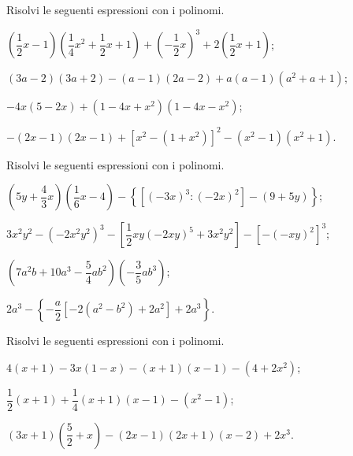 \begin{esercizio}
\label{ese:11.46} %
Risolvi le seguenti espressioni con i polinomi.
 \begin{enumeratea}
 \item $\left(\dfrac{1}{2}x-1\right)\left(\dfrac{1}{4}x^{2}+\dfrac{1}{2}x+1\right)+\left(-{\dfrac{1}{2}}x\right)^{3}+2\left(\dfrac{1}{2}x+1\right)$;
 \item $(3a-2)(3a+2)-(a-1)(2a-2)+a(a-1)\left(a^{2}+a+1\right)$;
 \item $-4x(5-2x)+\left(1-4x+x^{2}\right)\left(1-4x-x^{2}\right)$;
 \item $-(2x-1)(2x-1)+\left[x^{2}-\left(1+x^{2}\right)\right]^{2}-\left(x^{2}-1\right)\left(x^{2}+1\right)$.
 \end{enumeratea}
\end{esercizio}

\begin{esercizio}[\Ast]
\label{ese:11.47}
Risolvi le seguenti espressioni con i polinomi.
 \begin{enumeratea}
 \item $\left(5y+\dfrac{4}{3}x\right)\left(\dfrac{1}{6}x-4\right)-\left\lbrace\left[(-3x)^3:(-2x)^2\right]-(9+5y)\right\rbrace$;
 \item $3x^{2}y^{2}-\left(-2x^{2}y^{2}\right)^{3}-\left[\dfrac{1}{2}xy(-2xy)^{5}+3x^{2}y^{2}\right]-\left[-(-xy)^{2}\right]^{3}$;
 \item $\left(7a^{2}b+10a^{3}-\dfrac{5}{4}ab^{2}\right)\left(-\dfrac{3}{5}ab^{3}\right)$;
 \item $2a^{3}-\left\lbrace-\dfrac{a}{2}\left[-2\left(a^{2}-b^{2}\right)+2a^{2}\right]+2a^{3}\right\rbrace$.
 \end{enumeratea}
\end{esercizio}

\begin{esercizio}
\label{ese:11.48}
Risolvi le seguenti espressioni con i polinomi.
 \begin{enumeratea}
 \item $4(x+1)-3x(1-x)-(x+1)(x-1)-\left(4+2x^{2}\right)$;
 \item $\dfrac{1}{2}(x+1)+\dfrac{1}{4}(x+1)(x-1)-\left(x^{2}-1\right)$;
 \item $(3x+1)\left(\dfrac{5}{2}+x\right)-(2x-1)(2x+1)(x-2)+2x^{3}$.
 \end{enumeratea}
\end{esercizio}

